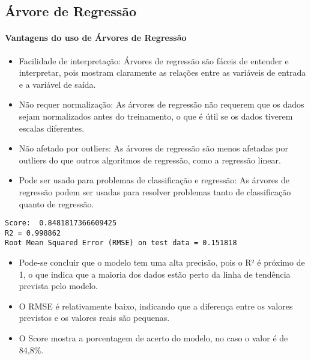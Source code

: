 \documentclass[11pt]{article}
\providecommand{\tightlist}{%
      \setlength{\itemsep}{0pt}\setlength{\parskip}{0pt}}
\begin{document}
    \hypertarget{uxe1rvore-de-regressuxe3o}{%
\subsection{Árvore de Regressão}\label{uxe1rvore-de-regressuxe3o}}

    \hypertarget{vantagens-do-uso-de-uxe1rvores-de-regressuxe3o}{%
\paragraph{Vantagens do uso de Árvores de
Regressão}\label{vantagens-do-uso-de-uxe1rvores-de-regressuxe3o}}

    \begin{itemize}
\tightlist
\item
  Facilidade de interpretação: Árvores de regressão são fáceis de
  entender e interpretar, pois mostram claramente as relações entre as
  variáveis de entrada e a variável de saída.
\item
  Não requer normalização: As árvores de regressão não requerem que os
  dados sejam normalizados antes do treinamento, o que é útil se os
  dados tiverem escalas diferentes.
\item
  Não afetado por outliers: As árvores de regressão são menos afetadas
  por outliers do que outros algoritmos de regressão, como a regressão
  linear.
\item
  Pode ser usado para problemas de classificação e regressão: As árvores
  de regressão podem ser usadas para resolver problemas tanto de
  classificação quanto de regressão.
\end{itemize}


    \begin{Verbatim}[commandchars=\\\{\}]
Score:  0.8481817366609425
R2 = 0.998862
Root Mean Squared Error (RMSE) on test data = 0.151818
    \end{Verbatim}

    \begin{itemize}
\tightlist
\item
  Pode-se concluir que o modelo tem uma alta precisão, pois o R² é
  próximo de 1, o que indica que a maioria dos dados estão perto da
  linha de tendência prevista pelo modelo.
\item
  O RMSE é relativamente baixo, indicando que a diferença entre os
  valores previstos e os valores reais são pequenas.
\item
  O Score mostra a porcentagem de acerto do modelo, no caso o valor é de
  84,8\%.
\end{itemize}
\end{document}
